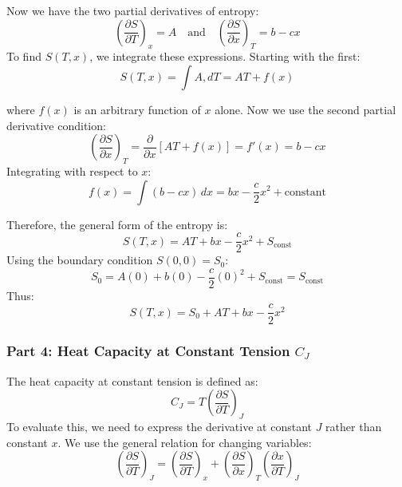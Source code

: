 \documentclass[10pt,twocoloumn]{article}
\begin{document}
Now we have the two partial derivatives of entropy:
\begin{equation}
    \left(\frac{\partial S}{\partial T}\right)_x = A \quad \text{and} \quad \left(\frac{\partial S}{\partial x}\right)_T = b - cx
\end{equation}
To find $S(T,x)$, we integrate these expressions. Starting with the first:
\begin{equation}
    S(T,x) = \int A , dT = AT + f(x)
\end{equation}

where $f(x)$ is an arbitrary function of $x$ alone. Now we use the second partial derivative condition:
\begin{equation}
\left(\frac{\partial S}{\partial x}\right)_T = \frac{\partial}{\partial x}[AT + f(x)] = f'(x) = b - cx
\end{equation}
Integrating with respect to $x$:
\begin{equation}
    f(x) = \int (b - cx) \, dx = bx - \frac{c}{2}x^2 + \text{constant}
    \end{equation}

Therefore, the general form of the entropy is:
\begin{equation}
    S(T,x) = AT + bx - \frac{c}{2}x^2 + S_{\text{const}}
    \end{equation}
Using the boundary condition $S(0,0) = S_0$:
\begin{equation}
    S_0 = A(0) + b(0) - \frac{c}{2}(0)^2 + S_{\text{const}} = S_{\text{const}}
\end{equation}
Thus:
\begin{equation}
    \boxed{S(T,x) = S_0 + AT + bx - \frac{c}{2}x^2}
    \end{equation}
\subsubsection*{Part 4: Heat Capacity at Constant Tension $C_J$}

The heat capacity at constant tension is defined as:
\begin{equation}
    C_J = T\left(\frac{\partial S}{\partial T}\right)_J
    \end{equation}
To evaluate this, we need to express the derivative at constant $J$ rather than constant $x$. We use the general relation for changing variables:
\begin{equation}
    \left(\frac{\partial S}{\partial T}\right)_J = \left(\frac{\partial S}{\partial T}\right)_x + \left(\frac{\partial S}{\partial x}\right)_T \left(\frac{\partial x}{\partial T}\right)_J
    \end{equation}
\end{document}
